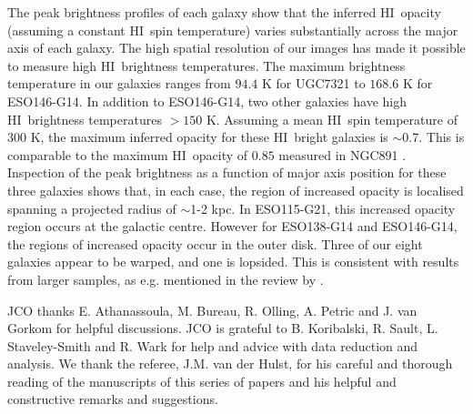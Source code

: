 \documentclass[traditabstract]{aa} %
\newcommand\HI{H{\small I}}
\begin{document}
The peak brightness profiles of each galaxy show that the inferred \HI\
opacity (assuming a constant \HI\ spin temperature) varies
substantially across the major axis of each galaxy. The high spatial
resolution of our images has made it possible to measure high \HI\
brightness temperatures. The maximum brightness temperature in our
galaxies ranges from $94.4$ K for UGC7321 to $168.6$ K for ESO146-G14.
In addition to ESO146-G14, two other galaxies have high \HI\ brightness
temperatures $> 150$ K. Assuming a mean \HI\ spin temperature of $300$
K, the maximum inferred opacity for these \HI\ bright galaxies is
$\sim$0.7. This is comparable to the maximum \HI\ opacity of $0.85$
measured in NGC891 \citep{kvdkdb2004}. Inspection of the peak
brightness as a function of major axis position for these three
galaxies shows that, in each case, the region of increased opacity is
localised spanning a projected radius of $\sim$1-2 kpc. In ESO115-G21,
this increased opacity region occurs at the galactic centre. However
for ESO138-G14 and ESO146-G14, the regions of increased opacity occur in
the outer disk.
Three of our eight galaxies appear to be warped, and one
is lopsided. This is consistent with results from larger samples,
as e.g. mentioned in the review by \citet{sancisi2008}.

\begin{acknowledgements}

JCO thanks E. Athanassoula,
M.  Bureau, R.  Olling, A. Petric and J. van Gorkom for helpful
discussions.  JCO is grateful to B. Koribalski, R. Sault, L.
Staveley-Smith and R.  Wark for help and advice with data reduction and
analysis. We thank the referee, J.M. van der Hulst, for
his careful and  thorough reading of the manuscripts of this series of papers and 
his helpful and constructive remarks and suggestions.

\end{acknowledgements}
\end{document}
